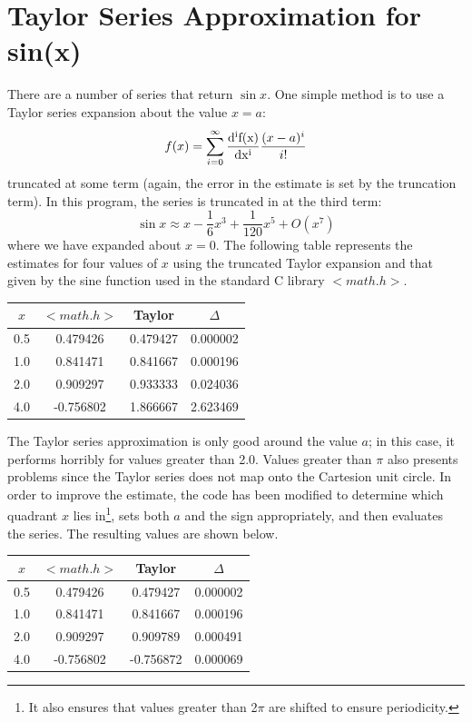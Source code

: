 \documentclass{scrartcl}
\begin{document}
\section{Taylor Series Approximation for sin(x)}
There are a number of series that return $\sin{x}$.
One simple method is to use a Taylor series expansion about the value $x=a$:
\begin{equation}
	f(x)=\sum_{i=0}^{\infty}{\frac{\rm{d}^{i}f(x)}{\rm{d}x^{i}}\frac{(x-a)^{i}}{i!}}
\end{equation}
truncated at some term (again, the error in the estimate is set by the truncation term).
In this program, the series is truncated in at the third term:
\begin{equation}
	\sin{x}\approx x-\frac{1}{6}x^{3}+\frac{1}{120}x^{5}+O(x^{7})
\end{equation}
where we have expanded about $x=0$.
The following table represents the estimates for four values of $x$ using the truncated Taylor expansion and that given by the sine function used in the standard \textsc{C} library $<math.h>$.
\begin{center}
	\begin{tabular}{|c|c|c|c|}\hline
		$x$ & $<math.h>$ & Taylor & $\Delta$ \\\hline
		0.5 & 0.479426 & 0.479427 & 0.000002 \\\hline
		1.0 & 0.841471 & 0.841667 & 0.000196 \\\hline
		2.0 & 0.909297 & 0.933333 & 0.024036 \\\hline
		4.0 & -0.756802 & 1.866667 & 2.623469 \\\hline
	\end{tabular}
\end{center}
The Taylor series approximation is only good around the value $a$; in this case, it performs horribly for values greater than 2.0.
Values greater than $\pi$ also presents problems since the Taylor series does not map onto the Cartesion unit circle.
In order to improve the estimate, the code has been modified to determine which quadrant $x$ lies in\footnote{It also ensures that values greater than 2$\pi$ are shifted to ensure periodicity.}, sets both $a$ and the sign appropriately, and then evaluates the series.
The resulting values are shown below.
\begin{center}
	\begin{tabular}{|c|c|c|c|}\hline
		$x$ & $<math.h>$ & Taylor & $\Delta$ \\\hline
		0.5 & 0.479426 & 0.479427 & 0.000002 \\\hline
		1.0 & 0.841471 & 0.841667 & 0.000196 \\\hline
		2.0 & 0.909297 & 0.909789 & 0.000491 \\\hline
		4.0 & -0.756802 & -0.756872 & 0.000069 \\\hline
	\end{tabular}
\end{center}
\end{document}
